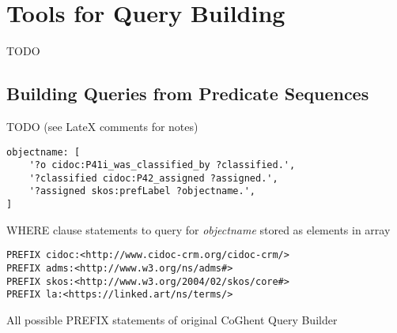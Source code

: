\chapter{Tools for Query Building}
\label{chap:tools_query_building}

TODO

\section{Building Queries from Predicate Sequences}
\label{sec:building_queries_predicate_sequences}

TODO (see LateX comments for notes)


%
\begin{listing}[htbp]
    \begin{verbatim}
objectname: [
    '?o cidoc:P41i_was_classified_by ?classified.',
    '?classified cidoc:P42_assigned ?assigned.',
    '?assigned skos:prefLabel ?objectname.',
]
    \end{verbatim}
    \caption{WHERE clause statements to query for \textit{objectname} stored as elements in array}
    \label{lst:where_statements_array}
\end{listing}
%
\begin{listing}[htbp]
    \begin{verbatim}
PREFIX cidoc:<http://www.cidoc-crm.org/cidoc-crm/>
PREFIX adms:<http://www.w3.org/ns/adms#>
PREFIX skos:<http://www.w3.org/2004/02/skos/core#>
PREFIX la:<https://linked.art/ns/terms/>
    \end{verbatim}
    \caption{All possible PREFIX statements of original CoGhent Query Builder}
    \label{lst:prefix_statements_original}
\end{listing}
%



